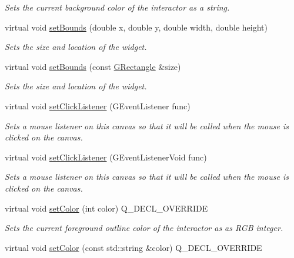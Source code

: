 \begin{DoxyCompactItemize}
\begin{DoxyCompactList}\small\item\em Sets the current background color of the interactor as a string. \end{DoxyCompactList}\item 
virtual void \mbox{\hyperlink{classGInteractor_a2aae8197624b72265ab83b4f1bc73f2f}{set\+Bounds}} (double x, double y, double width, double height)
\begin{DoxyCompactList}\small\item\em Sets the size and location of the widget. \end{DoxyCompactList}\item 
virtual void \mbox{\hyperlink{classGInteractor_acada386653f008cacc7cce86426bef7c}{set\+Bounds}} (const \mbox{\hyperlink{classGRectangle}{G\+Rectangle}} \&size)
\begin{DoxyCompactList}\small\item\em Sets the size and location of the widget. \end{DoxyCompactList}\item 
virtual void \mbox{\hyperlink{classGCanvas_abd40af6921242584d0954f173911b190}{set\+Click\+Listener}} (G\+Event\+Listener func)
\begin{DoxyCompactList}\small\item\em Sets a mouse listener on this canvas so that it will be called when the mouse is clicked on the canvas. \end{DoxyCompactList}\item 
virtual void \mbox{\hyperlink{classGCanvas_a856414c92df90f56f3877475eb3f8fc4}{set\+Click\+Listener}} (G\+Event\+Listener\+Void func)
\begin{DoxyCompactList}\small\item\em Sets a mouse listener on this canvas so that it will be called when the mouse is clicked on the canvas. \end{DoxyCompactList}\item 
virtual void \mbox{\hyperlink{classGCanvas_a292eb0ce61f3fdb1d28b17e1e34928f7}{set\+Color}} (int color) Q\+\_\+\+D\+E\+C\+L\+\_\+\+O\+V\+E\+R\+R\+I\+DE
\begin{DoxyCompactList}\small\item\em Sets the current foreground outline color of the interactor as as R\+GB integer. \end{DoxyCompactList}\item 
virtual void \mbox{\hyperlink{classGCanvas_ad148324da1b0340e84e24dffa577ffca}{set\+Color}} (const std\+::string \&color) Q\+\_\+\+D\+E\+C\+L\+\_\+\+O\+V\+E\+R\+R\+I\+DE

\end{DoxyCompactItemize}
